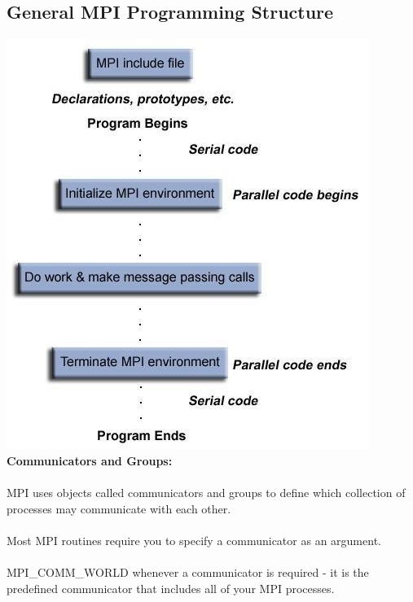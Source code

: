 \documentclass[a4paper,12pt]{article}
\begin{document}
	\subsection{General MPI Programming Structure}
		\includegraphics[width=\textwidth]{MPI_03}
\newpage		
\textbf{Communicators and Groups:} \\ \\
MPI uses objects called communicators and groups to define which collection of processes may communicate with each other.\\ \\
Most MPI routines require you to specify a communicator as an argument.\\ \\ 
MPI\_COMM\_WORLD whenever a communicator is required - it is the predefined communicator that includes all of your MPI processes. \\ \\
\end{document}
